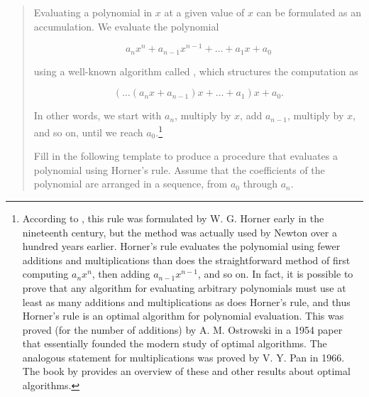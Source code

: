 \begin{quote}
 Evaluating a polynomial in \( x \)
at a given value of \( x \) can be formulated as an accumulation.  We evaluate
the polynomial

$$ a_n x^n + a_{n-1} x^{n-1} + \dots + a_1 x + a_0 $$

\noindent
using a well-known algorithm called , which structures
the computation as

$$ (\dots (a_n x + a_{n-1}) x + \dots + a_1) x + a_0. $$

\noindent
In other words, we start with \( a_n \), multiply by \( x \), add
\( a_{n-1} \), multiply by \( x \), and so on, until we reach
\( a_0 \).\footnote{According to , this rule was formulated by
W. G. Horner early in the nineteenth century, but the method was actually used
by Newton over a hundred years earlier.  Horner's rule evaluates the polynomial
using fewer additions and multiplications than does the straightforward method
of first computing \( a_n x^n \), then adding
\( a_{n-1}x^{n-1} \), and so on.  In fact, it is possible to prove
that any algorithm for evaluating arbitrary polynomials must use at least as
many additions and multiplications as does Horner's rule, and thus Horner's
rule is an optimal algorithm for polynomial evaluation.  This was proved (for
the number of additions) by A. M. Ostrowski in a 1954 paper that essentially
founded the modern study of optimal algorithms.  The analogous statement for
multiplications was proved by V. Y. Pan in 1966.  The book by 
provides an overview of these and other results about optimal
algorithms.}

Fill in the following template to produce a procedure that evaluates a
polynomial using Horner's rule.  Assume that the coefficients of the polynomial
are arranged in a sequence, from \( a_0 \) through \( a_n \).


\end{quote}
